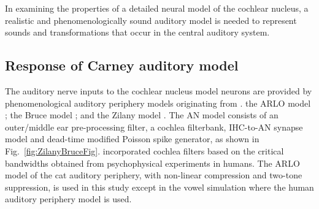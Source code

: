 In examining the properties of a detailed neural model of the cochlear nucleus,
a realistic and phenomenologically sound auditory model is needed to represent
sounds and transformations that occur in the central auditory system.

%
 \subsection{Response of Carney auditory model }
The auditory nerve inputs to the cochlear nucleus
 model neurons are provided by phenomenological auditory periphery models
 originating from \citet{Carney:1993} . the ARLO model
 \citep{HeinzZhangEtAl:2001}; the Bruce model \citep{BruceSachsEtAl:2003,
   ZilanyBruce:2006, ZilanyBruce:2007}; and the Zilany model
 \citep{ZilanyBruceEtAl:2009}. The AN model consists of an outer/middle ear
 pre-processing filter, a cochlea filterbank, IHC-to-AN synapse model and
 dead-time modified Poisson spike generator, as shown in
 Fig.~\ref{fig:ZilanyBruceFig}. \citep{HeinzZhangEtAl:2001} incorporated cochlea
 filters based on the critical bandwidths obtained from psycho\-physical
 experiments in humans. The ARLO model of the cat auditory periphery, with
 non-linear compression and two-tone suppression, is used in this study except
 in the vowel simulation where the human auditory periphery model is used.







